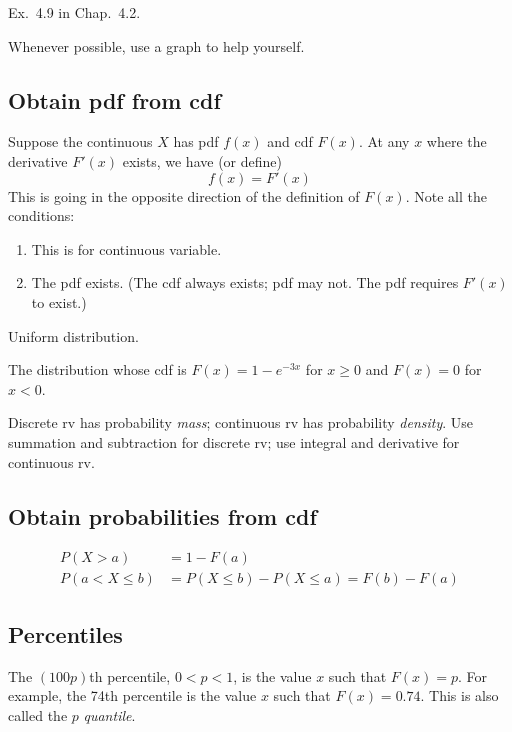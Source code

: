 \documentclass[12pt]{article}
\begin{document}
\example Ex.~4.9 in Chap.~4.2.

\alert Whenever possible, use a graph to help yourself.

\subsection{Obtain pdf from cdf}

Suppose the continuous $X$ has pdf $f(x)$ and cdf $F(x)$.
At any $x$ where the derivative $F'(x)$ exists, we have (or define)
\[
f(x) = F'(x)
\]
This is going in the opposite direction of the definition of $F(x)$.
Note all the conditions:
\begin{enumerate}
\item This is for continuous variable.
\item The pdf exists. (The cdf always exists; pdf may not.
The pdf requires $F'(x)$ to exist.)
\end{enumerate}


\example Uniform distribution.

\example The distribution whose cdf is $F(x) = 1 - e^{-3x}$ for $x \ge 0$
and $F(x) = 0$ for $x < 0$.


\note Discrete rv has probability \emph{mass};
continuous rv has probability \emph{density}.
Use summation and subtraction for discrete rv;
use integral and derivative for continuous rv.

\subsection{Obtain probabilities from cdf}

\[\begin{split}
P(X > a) &= 1 - F(a) \\
P(a < X \le b) &= P(X \le b) - P(X \le a) = F(b) - F(a)
\end{split}
\]


\subsection{Percentiles}

The $(100p)$th percentile, $0 < p < 1$,
is the value $x$ such that $F(x) = p$.
For example, the 74th percentile is the value $x$ such that
$F(x) = 0.74$.
This is also called the $p$ \emph{quantile}.
\end{document}
